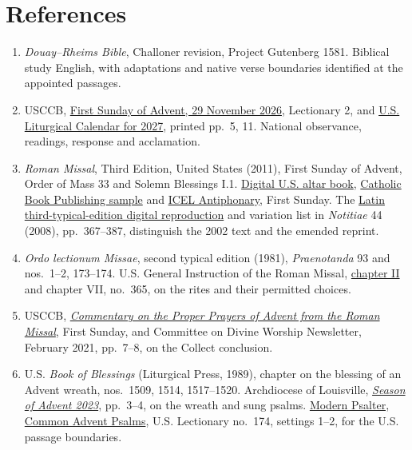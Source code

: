 \section{References}
\begin{enumerate}
\item \textit{Douay--Rheims Bible}, Challoner revision, Project Gutenberg 1581. Biblical study English, with adaptations and native verse boundaries identified at the appointed passages.
\item USCCB, \href{https://bible.usccb.org/bible/readings/112926.cfm}{First Sunday of Advent, 29 November 2026}, Lectionary 2, and \href{https://www.usccb.org/resources/2027cal.pdf}{U.S. Liturgical Calendar for 2027}, printed pp.~5, 11. National observance, readings, response and acclamation.
\item \textit{Roman Missal}, Third Edition, United States (2011), First Sunday of Advent, Order of Mass 33 and Solemn Blessings I.1. \href{https://archive.org/download/Roman-Missal-Third-Edition/Roman\%20Missal.pdf}{Digital U.S. altar book}, \href{https://b2c-cbp-assets.s3.amazonaws.com/pdfs/9780899420738.pdf}{Catholic Book Publishing sample} and \href{https://www.liturgyoffice.org.uk/Missal/Music/Antiphonary.pdf}{ICEL Antiphonary}, First Sunday. The \href{https://media.musicasacra.com/books/latin_missal2002.pdf}{Latin third-typical-edition digital reproduction} and variation list in \textit{Notitiae} 44 (2008), pp.~367--387, distinguish the 2002 text and the emended reprint.
\item \textit{Ordo lectionum Missae}, second typical edition (1981), \textit{Praenotanda} 93 and nos.~1--2, 173--174. U.S. General Instruction of the Roman Missal, \href{https://www.usccb.org/prayer-and-worship/the-mass/general-instruction-of-the-roman-missal/girm-chapter-2}{chapter II} and chapter VII, no.~365, on the rites and their permitted choices.
\item USCCB, \href{https://www.usccb.org/prayer-and-worship/liturgical-year-and-calendar/advent/commentary-on-advent-proper-prayers}{\textit{Commentary on the Proper Prayers of Advent from the Roman Missal}}, First Sunday, and Committee on Divine Worship Newsletter, February 2021, pp.~7--8, on the Collect conclusion.
\item U.S. \textit{Book of Blessings} (Liturgical Press, 1989), chapter on the blessing of an Advent wreath, nos.~1509, 1514, 1517--1520. Archdiocese of Louisville, \href{https://www.archlou.org/wp-content/uploads/2023/09/Advent-2023.pdf}{\textit{Season of Advent 2023}}, pp.~3--4, on the wreath and sung psalms. \href{https://www.modernpsalter.com/us/Lectionary.aspx?n=174\&s=0}{Modern Psalter, Common Advent Psalms}, U.S. Lectionary no.~174, settings 1--2, for the U.S. passage boundaries.

\end{enumerate}
